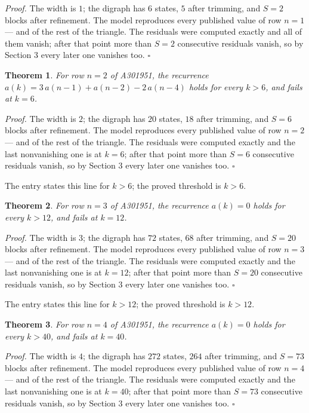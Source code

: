 \documentclass[11pt]{article}
\newtheorem{theorem}{Theorem}
\theoremstyle{definition}
\begin{document}
{\itshape Proof.} The width is $1$; the digraph has $6$ states, $5$ after trimming, and $S = 2$ blocks after refinement. The model reproduces every published value of row $n = 1$ --- and of the rest of the triangle. The residuals were computed exactly and all of them vanish; after that point more than $S = 2$ consecutive residuals vanish, so by Section 3 every later one vanishes too. $\square$

\begin{theorem} For row $n = 2$ of A301951, the recurrence $a(k) = 3\,a(n-1) + a(n-2) - 2\,a(n-4)$ holds for every $k > 6$, and fails at $k = 6$.\end{theorem}

{\itshape Proof.} The width is $2$; the digraph has $20$ states, $18$ after trimming, and $S = 6$ blocks after refinement. The model reproduces every published value of row $n = 2$ --- and of the rest of the triangle. The residuals were computed exactly and the last nonvanishing one is at $k = 6$; after that point more than $S = 6$ consecutive residuals vanish, so by Section 3 every later one vanishes too. $\square$

The entry states this line for $k > 6$; the proved threshold is $k > 6$.

\begin{theorem} For row $n = 3$ of A301951, the recurrence $a(k) = 0$ holds for every $k > 12$, and fails at $k = 12$.\end{theorem}

{\itshape Proof.} The width is $3$; the digraph has $72$ states, $68$ after trimming, and $S = 20$ blocks after refinement. The model reproduces every published value of row $n = 3$ --- and of the rest of the triangle. The residuals were computed exactly and the last nonvanishing one is at $k = 12$; after that point more than $S = 20$ consecutive residuals vanish, so by Section 3 every later one vanishes too. $\square$

The entry states this line for $k > 12$; the proved threshold is $k > 12$.

\begin{theorem} For row $n = 4$ of A301951, the recurrence $a(k) = 0$ holds for every $k > 40$, and fails at $k = 40$.\end{theorem}

{\itshape Proof.} The width is $4$; the digraph has $272$ states, $264$ after trimming, and $S = 73$ blocks after refinement. The model reproduces every published value of row $n = 4$ --- and of the rest of the triangle. The residuals were computed exactly and the last nonvanishing one is at $k = 40$; after that point more than $S = 73$ consecutive residuals vanish, so by Section 3 every later one vanishes too. $\square$
\end{document}
